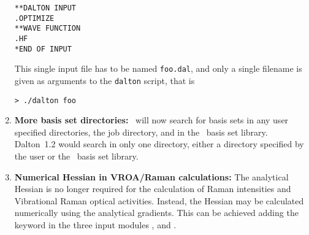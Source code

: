 \begin{enumerate}
\begin{verbatim}
**DALTON INPUT
.OPTIMIZE
**WAVE FUNCTION
.HF
*END OF INPUT
\end{verbatim}
This single input file has to be named \verb|foo.dal|, and only a
single filename is given as arguments to the \verb|dalton| script, that is

\begin{verbatim}
> ./dalton foo
\end{verbatim}

\item{\bf More basis set directories:} \dalton\ will now search for basis sets
in any user specified directories, the job directory, and in the \dalton\ basis
set library. Dalton~1.2 would search in only one directory,
either a directory specified by the user
or the \dalton\ basis set library.


%
\item{\bf Numerical Hessian in VROA/Raman calculations:} The
  analytical Hessian is no longer required for the calculation of
  Raman intensities and Vibrational Raman optical activities. Instead,
  the Hessian may be calculated numerically using the analytical
  gradients. This can be achieved adding the keyword  in
  the three input modules ,  and .

\end{enumerate}

